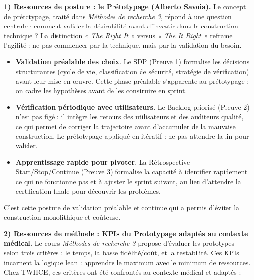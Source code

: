 \medskip

\textbf{1) Ressources de posture : le Prétotypage (Alberto Savoia).}
Le concept de prétotypage, traité dans \textit{Méthodes de recherche 3}, répond à une question centrale : comment valider la désirabilité avant d'investir dans la construction technique ? La distinction \emph{« The Right It »} versus \emph{« The It Right »} reframe l'agilité : ne pas commencer par la technique, mais par la validation du besoin.

\begin{itemize}
  \item \textbf{Validation préalable des choix}. Le SDP (Preuve 1) formalise les décisions structurantes (cycle de vie, classification de sécurité, stratégie de vérification) avant leur mise en œuvre. Cette phase préalable s'apparente au prétotypage : on cadre les hypothèses avant de les construire en sprint.
  \item \textbf{Vérification périodique avec utilisateurs}. Le Backlog priorisé (Preuve 2) n'est pas figé : il intègre les retours des utilisateurs et des auditeurs qualité, ce qui permet de corriger la trajectoire avant d'accumuler de la mauvaise construction. Le prétotypage appliqué en itératif : ne pas attendre la fin pour valider.
  \item \textbf{Apprentissage rapide pour pivoter}. La Rétrospective Start/Stop/Continue (Preuve 3) formalise la capacité à identifier rapidement ce qui ne fonctionne pas et à ajuster le sprint suivant, au lieu d'attendre la certification finale pour découvrir les problèmes.
\end{itemize}

C'est cette posture de validation préalable et continue qui a permis d'éviter la construction monolithique et coûteuse.

\textbf{2) Ressources de méthode : KPIs du Prototypage adaptés au contexte médical.}
Le cours \textit{Méthodes de recherche 3} propose d'évaluer les prototypes selon trois critères : le temps, la basse fidélité/coût, et la testabilité. Ces KPIs incarnent la logique lean : apprendre le maximum avec le minimum de ressources. Chez TWIICE, ces critères ont été confrontés au contexte médical et adaptés :

